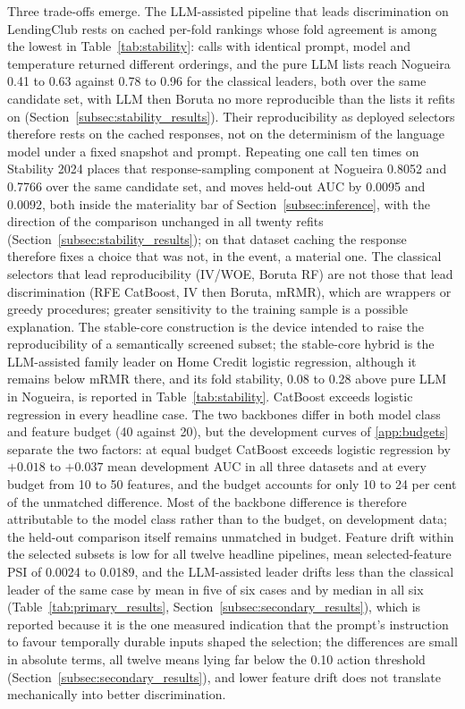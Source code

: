 \documentclass[final,5p,twocolumn]{elsarticle}
\begin{document}
Three trade-offs emerge. The LLM-assisted pipeline that leads discrimination on LendingClub rests on cached per-fold rankings whose fold agreement is among the lowest in Table~\ref{tab:stability}: calls with identical prompt, model and temperature returned different orderings, and the pure LLM lists reach Nogueira 0.41 to 0.63 against 0.78 to 0.96 for the classical leaders, both over the same candidate set, with LLM then Boruta no more reproducible than the lists it refits on (Section~\ref{subsec:stability_results}). Their reproducibility as deployed selectors therefore rests on the cached responses, not on the determinism of the language model under a fixed snapshot and prompt. Repeating one call ten times on Stability 2024 places that response-sampling component at Nogueira 0.8052 and 0.7766 over the same candidate set, and moves held-out AUC by 0.0095 and 0.0092, both inside the materiality bar of Section~\ref{subsec:inference}, with the direction of the comparison unchanged in all twenty refits (Section~\ref{subsec:stability_results}); on that dataset caching the response therefore fixes a choice that was not, in the event, a material one. The classical selectors that lead reproducibility (IV/WOE, Boruta RF) are not those that lead discrimination (RFE CatBoost, IV then Boruta, mRMR), which are wrappers or greedy procedures; greater sensitivity to the training sample is a possible explanation. The stable-core construction is the device intended to raise the reproducibility of a semantically screened subset; the stable-core hybrid is the LLM-assisted family leader on Home Credit logistic regression, although it remains below mRMR there, and its fold stability, 0.08 to 0.28 above pure LLM in Nogueira, is reported in Table~\ref{tab:stability}. CatBoost exceeds logistic regression in every headline case. The two backbones differ in both model class and feature budget (40 against 20), but the development curves of \ref{app:budgets} separate the two factors: at equal budget CatBoost exceeds logistic regression by $+0.018$ to $+0.037$ mean development AUC in all three datasets and at every budget from 10 to 50 features, and the budget accounts for only 10 to 24 per cent of the unmatched difference. Most of the backbone difference is therefore attributable to the model class rather than to the budget, on development data; the held-out comparison itself remains unmatched in budget. Feature drift within the selected subsets is low for all twelve headline pipelines, mean selected-feature PSI of 0.0024 to 0.0189, and the LLM-assisted leader drifts less than the classical leader of the same case by mean in five of six cases and by median in all six (Table~\ref{tab:primary_results}, Section~\ref{subsec:secondary_results}), which is reported because it is the one measured indication that the prompt's instruction to favour temporally durable inputs shaped the selection; the differences are small in absolute terms, all twelve means lying far below the 0.10 action threshold (Section~\ref{subsec:secondary_results}), and lower feature drift does not translate mechanically into better discrimination.
\end{document}
